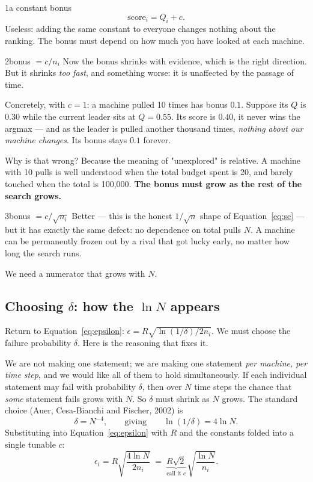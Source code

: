 \begin{attempt}{1}{a constant bonus}
\[
\text{score}_i = Q_i + c .
\]
Useless: adding the same constant to everyone changes nothing about the ranking. The bonus
must depend on how much you have looked at each machine.
\end{attempt}

\begin{attempt}{2}{bonus $= c/n_i$}
Now the bonus shrinks with evidence, which is the right direction. But it shrinks
\emph{too fast}, and something worse: it is unaffected by the passage of time.

Concretely, with $c = 1$: a machine pulled 10 times has bonus $0.1$. Suppose its $Q$ is
$0.30$ while the current leader sits at $Q = 0.55$. Its score is $0.40$, it never wins the
argmax --- and as the leader is pulled another thousand times, \emph{nothing about our
machine changes}. Its bonus stays $0.1$ forever.

Why is that wrong? Because the meaning of "unexplored" is relative. A machine with 10 pulls
is well understood when the total budget spent is 20, and barely touched when the total is
100{,}000. \textbf{The bonus must grow as the rest of the search grows.}
\end{attempt}

\begin{attempt}{3}{bonus $= c/\sqrt{n_i}$}
Better --- this is the honest $1/\sqrt{n}$ shape of Equation~\eqref{eq:se} --- but it has
exactly the same defect: no dependence on total pulls $N$. A machine can be permanently
frozen out by a rival that got lucky early, no matter how long the search runs.

We need a numerator that grows with $N$.
\end{attempt}

\subsection{Choosing $\delta$: how the $\ln N$ appears}

Return to Equation~\eqref{eq:epsilon}: $\epsilon = R\sqrt{\ln(1/\delta)/2n_i}$. We must
choose the failure probability $\delta$. Here is the reasoning that fixes it.

We are not making one statement; we are making one statement \emph{per machine, per time
step}, and we would like all of them to hold simultaneously. If each individual statement
may fail with probability $\delta$, then over $N$ time steps the chance that \emph{some}
statement fails grows with $N$. So $\delta$ must shrink as $N$ grows. The standard choice
(Auer, Cesa-Bianchi and Fischer, 2002) is
\[
\delta = N^{-4}, \qquad\text{giving}\qquad \ln(1/\delta) = 4\ln N .
\]
Substituting into Equation~\eqref{eq:epsilon} with $R$ and the constants folded into a single
tunable $c$:
\[
\epsilon_i = R\sqrt{\frac{4 \ln N}{2 n_i}} \;=\; \underbrace{R\sqrt{2}}_{\text{call it } c}\,
\sqrt{\frac{\ln N}{n_i}} .
\]

